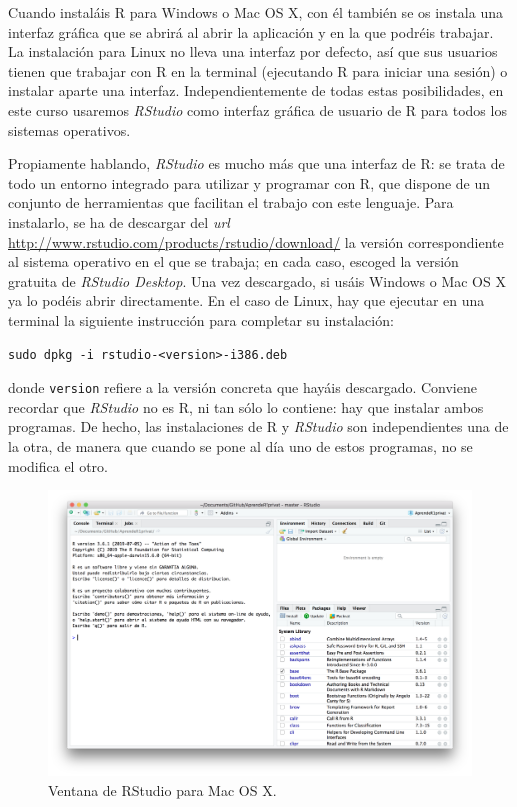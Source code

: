 \documentclass[
]{book}
\theoremstyle{definition}
\theoremstyle{definition}
\theoremstyle{definition}
\theoremstyle{remark}
\begin{document}
Cuando instaláis R para Windows o Mac OS X, con él también se os instala una interfaz gráfica que se abrirá al abrir la aplicación y en la que podréis trabajar. La instalación para Linux no lleva una interfaz por defecto, así que sus usuarios tienen que trabajar con R en la terminal (ejecutando R para iniciar una sesión) o instalar aparte una interfaz. Independientemente de todas estas posibilidades, en este curso usaremos \emph{RStudio} como interfaz gráfica de usuario de R para todos los sistemas operativos.

Propiamente hablando, \emph{RStudio} es mucho más que una interfaz de R: se trata de todo un entorno integrado para utilizar y programar con R, que dispone de un conjunto de herramientas que facilitan el trabajo con este lenguaje. Para instalarlo, se ha de descargar del \emph{url} \url{http://www.rstudio.com/products/rstudio/download/} la versión correspondiente al sistema operativo en el que se trabaja; en cada caso, escoged la versión gratuita de \emph{RStudio Desktop}. Una vez descargado, si usáis Windows o Mac OS X ya lo podéis abrir directamente. En el caso de Linux, hay que ejecutar en una terminal la siguiente instrucción para completar su instalación:

\begin{verbatim}
sudo dpkg -i rstudio-<version>-i386.deb
\end{verbatim}

donde \texttt{version} refiere a la versión concreta que hayáis descargado. Conviene recordar que \emph{RStudio} no es R, ni tan sólo lo contiene: hay que instalar ambos programas. De hecho, las instalaciones de R y \emph{RStudio} son independientes una de la otra, de manera que cuando se pone al día uno de estos programas, no se modifica el otro.

\begin{figure}

{\centering \includegraphics[width=0.8\linewidth]{AprendeR-Parte-I_files/figure-html/rstudio1} 

}

\caption{Ventana de RStudio para Mac OS X.}\label{fig:rstudio1}
\end{figure}
\end{document}

